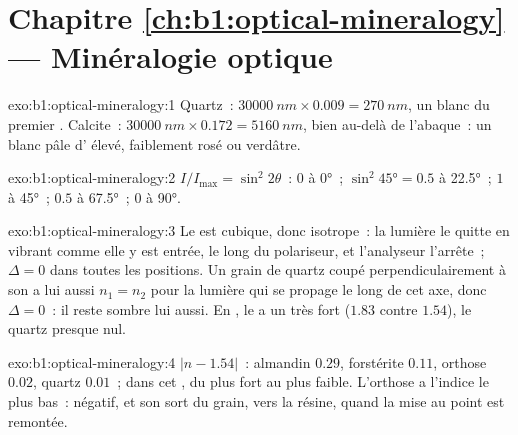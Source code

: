 \section*{Chapitre \ref{ch:b1:optical-mineralogy} --- Minéralogie optique}

\begin{solution}{exo:b1:optical-mineralogy:1}
Quartz~: $\qty{30000}{nm}\times0.009 = \qty{270}{nm}$, un blanc du premier .
Calcite~: $\qty{30000}{nm}\times0.172 = \qty{5160}{nm}$, bien au-delà de l'abaque~:
un blanc pâle d' élevé, faiblement rosé ou verdâtre.
\end{solution}

\begin{solution}{exo:b1:optical-mineralogy:2}
$I/I_{\max} = \sin^2 2\theta$~: $0$ à \ang{0}~; $\sin^2\ang{45} = 0.5$ à
\ang{22.5}~; $1$ à \ang{45}~; $0.5$ à \ang{67.5}~; $0$ à \ang{90}.
\end{solution}

\begin{solution}{exo:b1:optical-mineralogy:3}
Le  est cubique, donc isotrope~: la lumière le quitte en vibrant comme elle
y est entrée, le long du polariseur, et l'analyseur l'arrête~; $\Delta = 0$ dans
toutes les positions. Un grain de quartz coupé perpendiculairement à son  a lui aussi $n_1 = n_2$ pour la lumière qui se propage le long de cet
axe, donc $\Delta = 0$~: il reste sombre lui aussi. En , le  a un  très fort ($1.83$ contre $1.54$), le quartz
presque nul.
\end{solution}

\begin{solution}{exo:b1:optical-mineralogy:4}
$|n - 1.54|$~: almandin $0.29$, forstérite $0.11$, orthose $0.02$, quartz
$0.01$~;  dans cet , du plus fort au plus faible. L'orthose a l'indice
le plus bas~:  négatif, et son  sort du grain, vers la
résine, quand la mise au point est remontée.
\end{solution}

